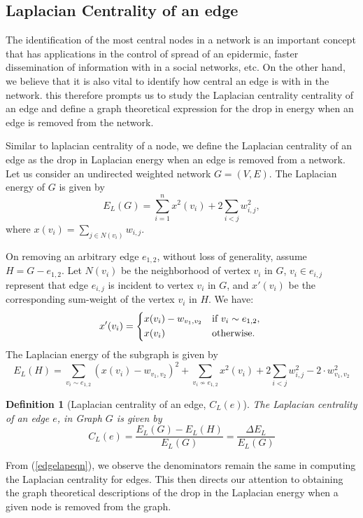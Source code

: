 \documentclass[10pt,a4paper]{article}
\newtheorem{defn}{Definition}
\begin{document}
\subsection{Laplacian Centrality of an edge}
The identification of the most central nodes in a network is an important concept that has applications in the control of spread of an epidermic, faster dissemination of information with in a social networks, etc. On the other hand, we believe that it is also vital to identify how central an edge is with in the network. this therefore prompts us to study the Laplacian centrality centrality of an edge and define a graph theoretical expression for the drop in energy when an edge is removed from the network.

Similar to laplacian centrality of a node, we define the Laplacian centrality of an edge as the drop in Laplacian energy when an edge is removed from a network.
Let us consider an undirected weighted network $G=(V,E)$. The Laplacian energy of $G$ is given by
\begin{equation}
E_L(G) = \sum_{i=1}^n x^2(v_i) + 2 \sum_{i<j} w^2_{i,j},
\label{edgelapG}
\end{equation} 	 
where $x(v_i) = \sum_{j\in N(v_i)} w_{i,j}$.

On removing an arbitrary edge $e_{1,2}$, without loss of generality, assume $H=G- e_{1,2}$. Let $N(v_i)$ be the neighborhood of vertex $v_i$ in $G$, $v_{i} \in e_{i,j}$ represent that edge $e_{i,j}$ is incident to vertex $v_i$ in $G$, and $x'(v_i)$ be the corresponding sum-weight of the vertex $v_i$ in $H$. We have:
\begin{equation}
x'(v_i) = \begin{cases*}
x(v_i)-w_{v_{1},v_{2}} & if  $v_i \sim e_{1,2}$,  \\
x(v_i) & otherwise.
\end{cases*}
\end{equation}
The Laplacian energy of the subgraph is given by
\begin{equation}
E_L(H) = \sum_{v_i \sim e_{1,2}} (x(v_i) - w_{v_{1},v_{2}})^2 + \sum_{v_i \nsim e_{1,2}} x^2(v_i) + 2 \sum_{i<j} w^2_{i,j}- 2 \cdot w^2_{v_{1},v_{2}}
\label{edgelapH}
\end{equation}

\begin{defn}[Laplacian centrality of an edge, $C_L(e)$]
	The Laplacian centrality of an edge $e$, in Graph $G$ is given by
	\begin{equation}
	C_L(e) = \frac{E_L(G) -E_L(H)}{E_L(G)} = \frac{\Delta E_L}{E_L(G)}
	\label{edgelapeqn}
	\end{equation}
\end{defn}
From (\ref{edgelapeqn}), we observe the denominators remain the same in computing the Laplacian centrality for edges. This then directs our attention to obtaining the graph theoretical descriptions of the drop in the Laplacian energy when a given node is removed from the graph.
\end{document}

